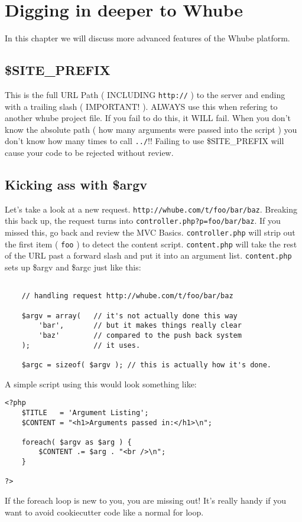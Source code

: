 \chapter{Digging in deeper to Whube}
In this chapter we will discuss more advanced features of the Whube platform.
\section{\$SITE\_PREFIX}
This is the full URL Path ( INCLUDING \texttt{http://} ) to the server and ending with
a trailing slash ( IMPORTANT! ). ALWAYS use this when refering to another whube project file.
If you fail to do this, it WILL fail. When you don't know the absolute path ( how many arguments
were passed into the script ) you don't know how many times to call \texttt{../}!! Failing to use \$SITE\_PREFIX
will cause your code to be rejected without review.
\section{Kicking ass with \$argv}
Let's take a look at a new request. \texttt{http://whube.com/t/foo/bar/baz}.
Breaking this back up, the request turns into \texttt{controller.php?p=foo/bar/baz}.
If you missed this, go back and review the MVC Basics. \texttt{controller.php} will
strip out the first item ( \texttt{foo} ) to detect the content script. \texttt{content.php}
will take the rest of the URL past a forward slash and put it into an argument list.
\texttt{content.php} sets up \$argv and \$argc just like this:
\begin{verbatim}

    // handling request http://whube.com/t/foo/bar/baz

    $argv = array(   // it's not actually done this way
        'bar',       // but it makes things really clear
        'baz'        // compared to the push back system
    );               // it uses.

    $argc = sizeof( $argv ); // this is actually how it's done.

\end{verbatim}
A simple script using this would look something like:
\begin{verbatim}
<?php
    $TITLE   = 'Argument Listing';
    $CONTENT = "<h1>Arguments passed in:</h1>\n";

    foreach( $argv as $arg ) {
        $CONTENT .= $arg . "<br />\n";
    }

?>
\end{verbatim}
If the foreach loop is new to you, you are missing out! It's really
handy if you want to avoid cookiecutter code like a normal for loop.
